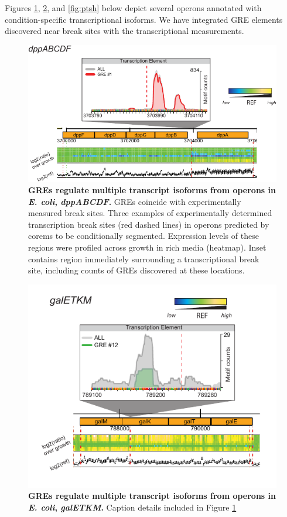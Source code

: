 Figures \ref{fig:dpp_ecoli_expression}, \ref{fig:galE}, and \ref{fig:ptsh} below depict several operons annotated with condition-specific transcriptional isoforms. We have integrated GRE elements discovered near break sites with the transcriptional measurements.

\begin{figure}[hp]
\centering
\includegraphics[width=0.7\linewidth]{figures/dpp_ecoli_expression.pdf}
\caption[GREs regulate multiple transcript isoforms from operons in {\it E. coli}, \textit{dppABCDF}]{\textbf{GREs regulate multiple transcript isoforms from operons in {\it E. coli}, \textit{dppABCDF}.} GREs coincide with experimentally measured break sites. Three examples of experimentally determined transcription break sites (red dashed lines) in operons predicted by corems to be conditionally segmented. Expression levels of these regions were profiled across growth in rich media (heatmap). Inset contains region immediately surrounding a transcriptional break site, including counts of GREs discovered at these locations.} 
\label{fig:dpp_ecoli_expression}
\end{figure}

\begin{figure}[hp]
\centering
\includegraphics[width=0.7\linewidth]{figures/galE.pdf}
\caption[GREs regulate multiple transcript isoforms from operons in
  {\it E. coli}, \textit{galETKM}]{\textbf{GREs regulate multiple
    transcript isoforms from operons in {\it E. coli},
    \textit{galETKM}.} Caption details included in Figure
  \ref{fig:dpp_ecoli_expression}}
\label{fig:galE}
\end{figure}

